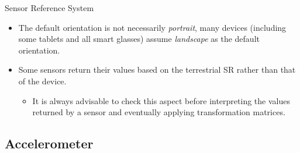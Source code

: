 \documentclass{beamer}
\begin{document}
\begin{frame}[allowframebreaks]{Sensor Reference System}
    \begin{itemize}\itemsep20pt
      \item The default orientation is not necessarily \textit{portrait}, many
      devices (including some tablets and all smart glasses) assume
      \textit{landscape} as the default orientation.
      \item Some sensors return their values based on the terrestrial SR rather
      than that of the device.
      \begin{itemize}
        \item It is always advisable to check this aspect before interpreting
        the values returned by a sensor and eventually applying transformation
        matrices.
      \end{itemize}
    \end{itemize}

  \end{frame}

\subsection{Accelerometer}
\end{document}
